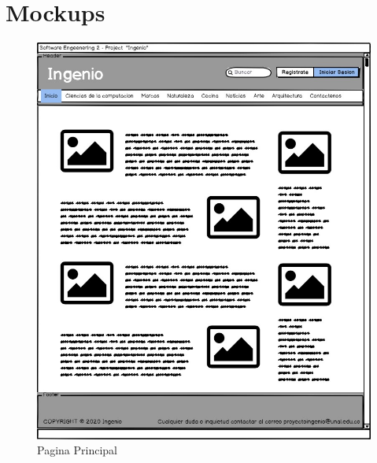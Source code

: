 \documentclass[a4paper,12 pt]{article}
\begin{document}
\section{Mockups}
\begin{figure}[H]
    \centering
    \includegraphics[scale = 0.7]{images/PaginaPrincipal.jpg}
    \caption{Pagina Principal}
    \label{F100}
\end{figure}{}
\end{document}
